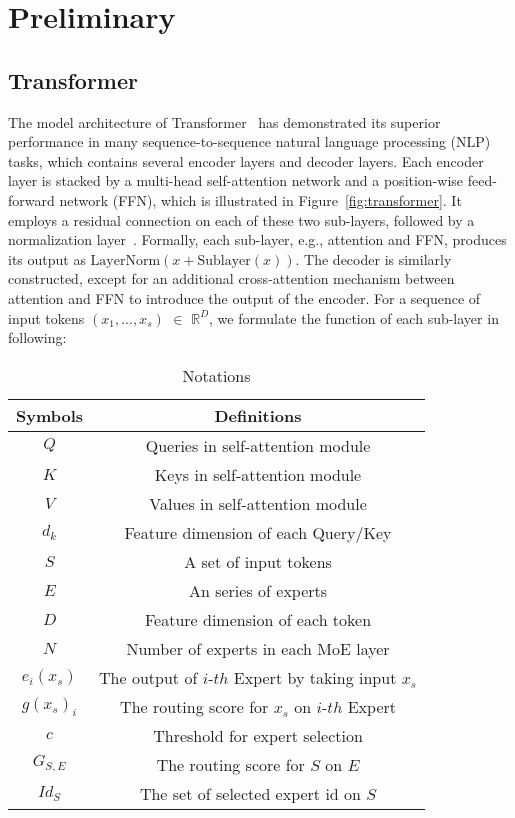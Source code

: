 \section{Preliminary}
\label{sec:preliminary}
\subsection{Transformer}

The model architecture of Transformer~\cite{vaswani2017attention} has demonstrated its superior performance in many sequence-to-sequence natural language processing (NLP) tasks, which contains several encoder layers and decoder layers. Each encoder layer is stacked by a multi-head self-attention network and a position-wise feed-forward network (FFN), which is illustrated in Figure~\ref{fig:transformer}. 
It employs a residual connection on each of these two sub-layers, followed by a normalization layer~\cite{DBLP:journals/corr/layernorm}. Formally, each sub-layer, e.g., attention and FFN, produces its output as $\text{LayerNorm}(x + \text{Sublayer}(x))$.
The decoder is similarly constructed, except for an additional cross-attention mechanism between attention and FFN to introduce the output of the encoder. For a sequence of input tokens $(x_{1},...,x_{s})$ $\in$ $\mathbb{R}^{D}$, we formulate the function of each sub-layer in following:

\begin{table}[t]
\centering
\renewcommand{\multirowsetup}{\centering}
\caption{Notations}
\label{tab:notation}
\vspace{-2mm}
\begin{tabular}{cc}
\toprule 
Symbols & Definitions \\
\midrule
$Q$ & Queries in self-attention module \\
\midrule
$K$ & Keys in self-attention module \\
\midrule
$V$ & Values in self-attention module\\
\midrule
$d_k$ & Feature dimension of each Query/Key \\
\midrule
$S$ & A set of input tokens \\
\midrule
$E$ & An series of experts\\
\midrule
$D$ & Feature dimension of each token \\
\midrule
$N$ & Number of experts in each MoE layer \\
\midrule
$e_{i}(x_s)$ & The output of $i$-$th$ Expert by taking input $x_s$ \\
\midrule
$g(x_s)_i$ & The routing score for $x_s$ on $i$-$th$ Expert\\
\midrule
$c$ & Threshold for expert selection \\

\midrule
$G_{S, E}$ & The routing score for $S$ on $E$ \\
\midrule
$Id_{S}$ & The set of selected expert id on $S$\\
\bottomrule
\end{tabular}
\end{table}

